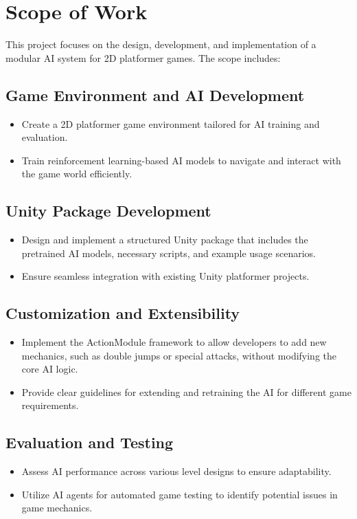 \documentclass[12pt,oneside,openright,a4paper]{cpe-english-project}
\begin{document}
\section{Scope of Work}

This project focuses on the design, development, and implementation of a modular AI system for 2D platformer games. The scope includes:

\subsection{Game Environment and AI Development}
\begin{itemize}
\item Create a 2D platformer game environment tailored for AI training and evaluation.
\item Train reinforcement learning-based AI models to navigate and interact with the game world efficiently.
\end{itemize}
\subsection{Unity Package Development}
\begin{itemize}
\item Design and implement a structured Unity package that includes the pretrained AI models, necessary scripts, and example usage scenarios.
\item Ensure seamless integration with existing Unity platformer projects.
\end{itemize}
\subsection{Customization and Extensibility}
\begin{itemize}
\item Implement the ActionModule framework to allow developers to add new mechanics, such as double jumps or special attacks, without modifying the core AI logic.
\item Provide clear guidelines for extending and retraining the AI for different game requirements.
\end{itemize}
\subsection{Evaluation and Testing}
\begin{itemize}
\item Assess AI performance across various level designs to ensure adaptability.
\item Utilize AI agents for automated game testing to identify potential issues in game mechanics.
\end{itemize}
\end{document}
